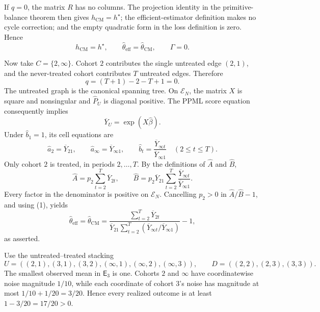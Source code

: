 If \(q=0\), the matrix \(R\) has no columns.  The projection identity in the primitive-balance theorem then gives
\(h_{\mathrm{CM}}=h^{\star}\); the efficient-estimator definition makes no cycle correction; and the empty quadratic form in the loss definition is zero.  Hence
\[
h_{\mathrm{CM}}=h^{\star},
\qquad
\widehat\theta_{\mathrm{eff}}=\widehat\theta_{\mathrm{CM}},
\qquad
\Gamma=0.                                                              \tag{1}
\]

Now take \(C=\{2,\infty\}\).  Cohort \(2\) contributes the single untreated edge \((2,1)\), and the never-treated cohort contributes \(T\) untreated edges.  Therefore
\[
q=(T+1)-2-T+1=0.                                                        \tag{2}
\]
The untreated graph is the canonical spanning tree.  On \(\mathcal E_N\), the matrix \(X\) is square and nonsingular and \(\widehat P_U\) is diagonal positive.  The PPML score equation consequently implies
\[
\overline Y_U=\exp(X\widehat\beta).                                   \tag{3}
\]
Under \(\widehat b_1=1\), its cell equations are
\[
\widehat a_2=\overline Y_{21},
\qquad
\widehat a_\infty=\overline Y_{\infty1},
\qquad
\widehat b_t=\frac{\overline Y_{\infty t}}{\overline Y_{\infty1}}
\quad(2\le t\le T).                                                     \tag{4}
\]
Only cohort \(2\) is treated, in periods \(2,\ldots,T\).  By the definitions of \(\widehat A\) and \(\widehat B\),
\[
\widehat A=p_2\sum_{t=2}^T\overline Y_{2t},
\qquad
\widehat B=p_2\overline Y_{21}
\sum_{t=2}^T\frac{\overline Y_{\infty t}}{\overline Y_{\infty1}}.    \tag{5}
\]
Every factor in the denominator is positive on \(\mathcal E_N\).  Cancelling \(p_2>0\) in \(\widehat A/\widehat B-1\), and using (1), yields
\[
\widehat\theta_{\mathrm{eff}}
=\widehat\theta_{\mathrm{CM}}
=\frac{\sum_{t=2}^T\overline Y_{2t}}
{\overline Y_{21}\sum_{t=2}^T
 (\overline Y_{\infty t}/\overline Y_{\infty1})}-1,
\]
as asserted.

Use the untreated--treated stacking
\[
U=((2,1),(3,1),(3,2),(\infty,1),(\infty,2),(\infty,3)),
\qquad
D=((2,2),(2,3),(3,3)).                                                    \tag{1}
\]
The smallest observed mean in \(\mathsf E_3\) is one.  Cohorts \(2\) and \(\infty\) have coordinatewise noise magnitude \(1/10\), while each coordinate of cohort \(3\)'s noise has magnitude at most
\(1/10+1/20=3/20\).  Hence every realized outcome is at least
\(1-3/20=17/20>0\).

